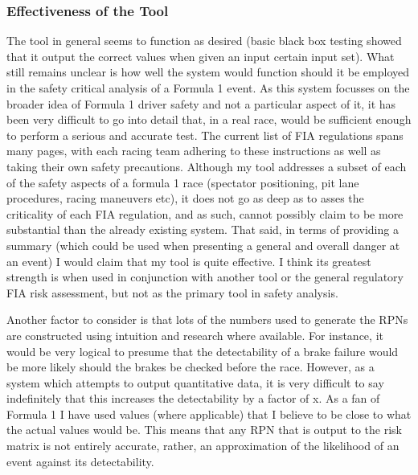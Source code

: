 \documentclass[12pt]{article} %
\begin{document}
\subsubsection{Effectiveness of the Tool}

The tool in general seems to function as desired (basic black box testing showed that it output the correct values when given an input certain input set). What still remains unclear is how well the system would function should it be employed in the safety critical analysis of a Formula 1 event. As this system focusses on the broader idea of Formula 1 driver safety and not a particular aspect of it, it has been very difficult to go into detail that, in a real race, would be sufficient enough to perform a serious and accurate test. The current list of FIA regulations spans many pages, with each racing team adhering to these instructions as well as taking their own safety precautions. Although my tool addresses a subset of each of the safety aspects of a formula 1 race (spectator positioning, pit lane procedures, racing maneuvers etc), it does not go as deep as to asses the criticality of each FIA regulation, and as such, cannot possibly claim to be more substantial than the already existing system. That said, in terms of providing a summary (which could be used when presenting a general and overall danger at an event) I would claim that my tool is quite effective. I think its greatest strength is when used in conjunction with another tool or the general regulatory FIA risk assessment, but not as the primary tool in safety analysis.

Another factor to consider is that lots of the numbers used to generate the RPNs are constructed using intuition and research where available. For instance, it would be very logical to presume that the detectability of a brake failure would be more likely should the brakes be checked before the race. However, as a system which attempts to output quantitative data, it is very difficult to say indefinitely that this increases the detectability by a factor of x. As a fan of Formula 1 I have used values (where applicable) that I believe to be close to what the actual values would be. This means that any RPN that is output to the risk matrix is not entirely accurate, rather, an approximation of the likelihood of an event against its detectability.


\end{document}
